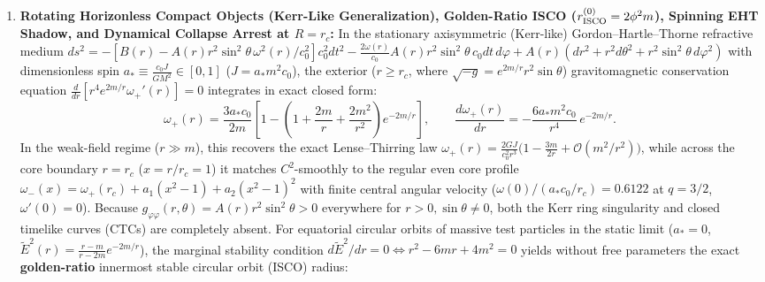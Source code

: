 \documentclass[11pt,a4paper]{article}
\begin{document}
\begin{enumerate}[label=\arabic*.]
\begin{equation}
\end{equation}
At the canonical benchmark $q = 3/2$, one obtains $\mathcal{I}_{\rm echo}(3/2) = 15.5553$ (with inner-cavity factor $\mathcal{I}_{\rm cav}(3/2) = 6.2528$ to the stable inner light ring and effective compactness $\epsilon_{\rm eff} = e^{-\mathcal{I}_{\rm echo}/4} = 0.02047$), predicting concrete post-merger echo delay times of $\Delta t_{\rm echo} = 0.766\text{ ms}$ ($10\,M_\odot$), $2.299\text{ ms}$ ($30\,M_\odot$), $4.750\text{ ms}$ (GW150914 $62\,M_\odot$ remnant), and $318.27\text{ s}$ (Sgr A*);
\item \textbf{Rotating Horizonless Compact Objects (Kerr-Like Generalization), Golden-Ratio ISCO ($r_{\rm ISCO}^{(0)} = 2\phi^2 m$), Spinning EHT Shadow, and Dynamical Collapse Arrest at $R = r_c$:} In the stationary axisymmetric (Kerr-like) Gordon--Hartle--Thorne refractive medium $ds^2 = -[B(r) - A(r)r^2\sin^2\theta\,\omega^2(r)/c_0^2]c_0^2 dt^2 - \frac{2\omega(r)}{c_0}A(r)r^2\sin^2\theta\,c_0 dt\,d\varphi + A(r)(dr^2 + r^2 d\theta^2 + r^2\sin^2\theta\,d\varphi^2)$ with dimensionless spin $a_* \equiv \frac{c_0 J}{G M^2} \in [0, 1]$ ($J = a_* m^2 c_0$), the exterior ($r \ge r_c$, where $\sqrt{-g} = e^{2m/r}r^2\sin\theta$) gravitomagnetic conservation equation $\frac{d}{dr}[r^4 e^{2m/r}\omega_+'(r)] = 0$ integrates in exact closed form:
\begin{equation}
\omega_+(r) = \frac{3 a_* c_0}{2 m}\left[1 - \left(1 + \frac{2m}{r} + \frac{2m^2}{r^2}\right)e^{-2m/r}\right], \qquad \frac{d\omega_+(r)}{dr} = -\frac{6 a_* m^2 c_0}{r^4}\,e^{-2m/r}.
\end{equation}
In the weak-field regime ($r \gg m$), this recovers the exact Lense--Thirring law $\omega_+(r) = \frac{2 G J}{c_0^2 r^3}\bigl(1 - \frac{3m}{2r} + \mathcal{O}(m^2/r^2)\bigr)$, while across the core boundary $r = r_c$ ($x = r/r_c = 1$) it matches $C^2$-smoothly to the regular even core profile $\omega_-(x) = \omega_+(r_c) + a_1(x^2-1) + a_2(x^2-1)^2$ with finite central angular velocity ($\omega(0)/(a_* c_0/r_c) = 0.6122$ at $q = 3/2$, $\omega'(0) = 0$). Because $g_{\varphi\varphi}(r,\theta) = A(r)r^2\sin^2\theta > 0$ everywhere for $r > 0, \sin\theta \neq 0$, both the Kerr ring singularity and closed timelike curves (CTCs) are completely absent. For equatorial circular orbits of massive test particles in the static limit ($a_* = 0$, $\tilde{E}^2(r) = \frac{r-m}{r-2m}e^{-2m/r}$), the marginal stability condition $d\tilde{E}^2/dr = 0 \iff r^2 - 6mr + 4m^2 = 0$ yields without free parameters the exact \textbf{golden-ratio} innermost stable circular orbit (ISCO) radius:

\end{enumerate}
\end{document}
